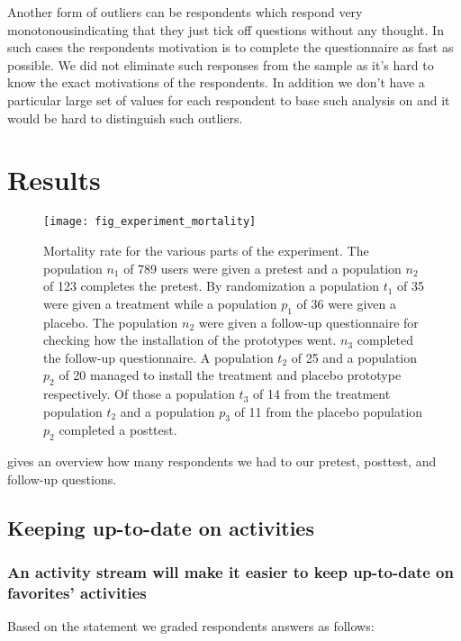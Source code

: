 Another form of outliers can be respondents which respond very
monotonous\dash{}indicating that they just tick off questions without any
thought. In such cases the respondents motivation is to complete the
questionnaire as fast as possible. We did not eliminate such responses from
the sample as it's hard to know the exact motivations of the respondents.
In addition we don't have a particular large set of values for each respondent
to base such analysis on and it would be hard to distinguish such outliers.

\section{Results}

\begin{figure}
  \texttt{[image: fig\_experiment\_mortality]}
  \caption[Experiment Mortality Rate]{
    Mortality rate for the various parts of the experiment.
    The population $n_1$ of 789 \urort{} users were given a pretest and
    a population $n_2$ of 123 completes the pretest.
    By randomization a population $t_1$ of 35 were given a treatment while
    a population $p_1$ of 36 were given a placebo.
    The population $n_2$ were given a follow-up questionnaire for checking
    how the installation of the prototypes went. $n_3$ completed the follow-up
    questionnaire.
    A population $t_2$ of 25 and a population $p_2$ of 20 managed to install
    the treatment and placebo prototype respectively.
    Of those a population $t_3$ of 14 from the treatment population $t_2$ and
    a population $p_3$ of 11 from the placebo population $p_2$ completed
    a posttest.
  }
  \label{figure:fig.experiment.mortality}
\end{figure}

 gives an overview how many respondents we
had to our pretest, posttest, and follow-up questions.

\subsection{Keeping up-to-date on activities}

\subsubsection{An activity stream will make it easier to keep up-to-date on
  favorites' activities}

Based on the statement
 we graded respondents answers as follows: 

